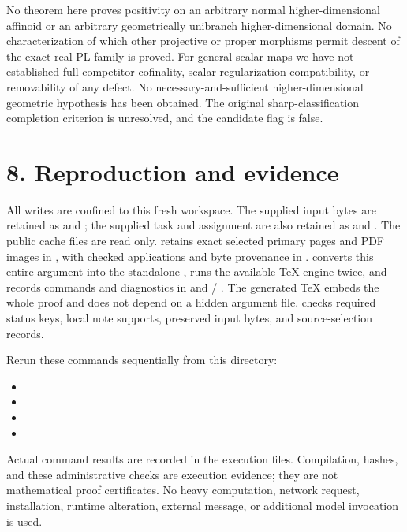 \documentclass[11pt,a4paper]{article}
\begin{document}
No theorem here proves positivity on an arbitrary normal higher-dimensional affinoid or an arbitrary geometrically unibranch higher-dimensional domain. No characterization of which other projective or proper morphisms permit descent of the exact real-PL family is proved. For general scalar maps we have not established full competitor cofinality, scalar regularization compatibility, or removability of any defect. No necessary-and-sufficient higher-dimensional geometric hypothesis has been obtained. The original sharp-classification completion criterion is unresolved, and the candidate flag is false.

\section*{8. Reproduction and evidence}

All writes are confined to this fresh workspace. The supplied input bytes are retained as \texttt{} and \texttt{}; the supplied task and assignment are also retained as \texttt{} and \texttt{}. The public cache files are read only. \texttt{} retains exact selected primary pages and PDF images in \texttt{}, with checked applications and byte provenance in \texttt{}. \texttt{} converts this entire argument into the standalone \texttt{}, runs the available TeX engine twice, and records commands and diagnostics in \texttt{} and \texttt{} / \texttt{}. The generated TeX embeds the whole proof and does not depend on a hidden argument file. \texttt{} checks required status keys, local note supports, preserved input bytes, and source-selection records.

Rerun these commands sequentially from this directory:

\begin{itemize}
\item \texttt{}
\item \texttt{}
\item \texttt{}
\item \texttt{}

\end{itemize}
Actual command results are recorded in the execution files. Compilation, hashes, and these administrative checks are execution evidence; they are not mathematical proof certificates. No heavy computation, network request, installation, runtime alteration, external message, or additional model invocation is used.
\end{document}
